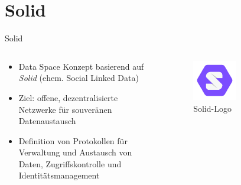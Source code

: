 
\section{Solid}

\begin{frame}{Solid \footnotesize\cite{mecklerWebLinkedData2023}}
    \begin{columns}
        \begin{column}{0.6\textwidth}
            \begin{itemize}
                \item Data Space Konzept basierend auf\\
                    \emph{Solid} (ehem. Social Linked Data)
                \item<2-> Ziel: offene, dezentralisierte Netzwerke für souveränen Datenaustausch
                \item<3-> Definition von Protokollen für Verwaltung und Austausch von Daten, Zugriffskontrolle und Identitätsmanagement
            \end{itemize}
        \end{column}
        
        \begin{column}{0.4\textwidth}
            \begin{figure}
                \includegraphics[width=0.5\textwidth]{./assets/solid_logo.pdf}
                \caption{Solid-Logo~\cite{solidcommunitygroupSolidemblemsvg2019}}
            \end{figure}
        \end{column}
    \end{columns}

\end{frame}


